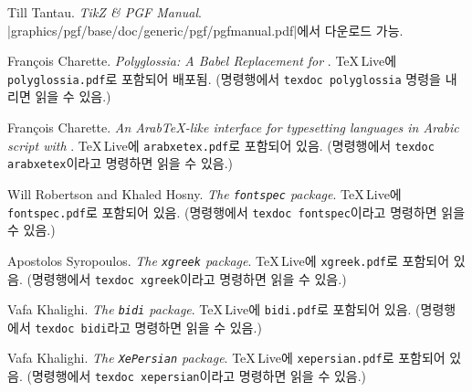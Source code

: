 \begin{thebibliography}{99}
 Till Tantau.
  \newblock \emph{TikZ \& PGF Manual}.
  \newblock \CTAN|graphics/pgf/base/doc/generic/pgf/pgfmanual.pdf|에서 다운로드 가능.

 Fran\c{c}ois Charette.
    \newblock \emph{Polyglossia: A Babel Replacement for }.
    \newblock \TeX\,Live에 \texttt{polyglossia.pdf}로 포함되어 배포됨. (명령행에서 \texttt{texdoc polyglossia}
    명령을 내리면 읽을 수 있음.)

 Fran\c{c}ois Charette.
    \newblock \emph{An Arab\TeX-like interface for typesetting languages
     in Arabic script with }.
  \newblock \TeX\,Live에 \texttt{arabxetex.pdf}로 포함되어 있음.
  (명령행에서 \texttt{texdoc arabxetex}이라고 명령하면 읽을 수 있음.)

 Will Robertson and Khaled Hosny.
    \newblock \emph{The \texttt{fontspec} package}.
  \newblock \TeX\,Live에 \texttt{fontspec.pdf}로 포함되어 있음.
  (명령행에서 \texttt{texdoc fontspec}이라고 명령하면 읽을 수 있음.)

 Apostolos Syropoulos.
    \newblock \emph{The \texttt{xgreek} package}.
  \newblock \TeX\,Live에 \texttt{xgreek.pdf}로 포함되어 있음.
  (명령행에서 \texttt{texdoc xgreek}이라고 명령하면 읽을 수 있음.)

 Vafa Khalighi.
    \newblock \emph{The \texttt{bidi} package}.
  \newblock \TeX\,Live에 \texttt{bidi.pdf}로 포함되어 있음.
  (명령행에서 \texttt{texdoc bidi}라고 명령하면 읽을 수 있음.)

 Vafa Khalighi.
    \newblock \emph{The \texttt{XePersian} package}.
  \newblock \TeX\,Live에 \texttt{xepersian.pdf}로 포함되어 있음.
  (명령행에서 \texttt{texdoc xepersian}이라고 명령하면 읽을 수 있음.)


\end{thebibliography}
